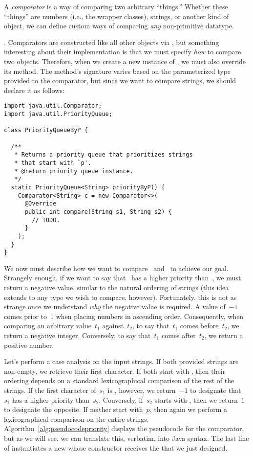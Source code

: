 A \emph{comparator} is a way of comparing two arbitrary ``things.'' 
Whether these ``things'' are numbers (i.e., the wrapper classes), strings, or another kind of object, we can define custom ways of comparing \emph{any} non-primitive datatype.

.
Comparators are constructed like all other objects via , but something interesting about their implementation is that we must specify \emph{how} to compare two objects. 
Therefore, when we create a new instance of , we must also override its  method. 
The  method's signature varies based on the parameterized type provided to the comparator, but since we want to compare strings, we should declare it as follows:

\begin{lstlisting}[language=MyJava]
import java.util.Comparator;
import java.util.PriorityQueue;

class PriorityQueueByP {

  /**
   * Returns a priority queue that prioritizes strings 
   * that start with `p'.
   * @return priority queue instance.
   */
  static PriorityQueue<String> priorityByP() {
    Comparator<String> c = new Comparator<>(
      @Override
      public int compare(String s1, String s2) { 
        // TODO.
      }
    );
  }
}
\end{lstlisting}

We now must describe how we want to compare~ and~ to achieve our goal.
Strangely enough, if we want to say that~ has a higher priority than~, we must return a negative value, similar to the natural ordering of strings (this idea extends to any type we wish to compare, however). 
Fortunately, this is not as strange once we understand \emph{why} the negative value is required. 
A value of~$-1$ comes prior to~$1$ when placing numbers in ascending order. 
Consequently, when comparing an arbitrary value~$t_1$ against~$t_2$, to say that~$t_1$ comes before~$t_2$, we return a negative integer. Conversely, to say that~$t_1$ comes after~$t_2$, we return a positive number.

Let's perform a case analysis on the input strings. 
If both provided strings are non-empty, we retrieve their first character. 
If both start with , then their ordering depends on a standard lexicographical comparison of the rest of the strings. 
If the first character of~$s_1$ is , however, we return~$-1$ to designate that~$s_1$ has a higher priority than~$s_2$. 
Conversely, if~$s_2$ starts with , then we return~$1$ to designate the opposite. 
If neither start with~$p$, then again we perform a lexicographical comparison on the entire strings. 
Algorithm~\ref{alg:pseudocodepriority} displays the pseudocode for the comparator, but as we will see, we can translate this, verbatim, into Java syntax. 
The last line of  instantiates a new  whose constructor receives the  that we just designed. 

